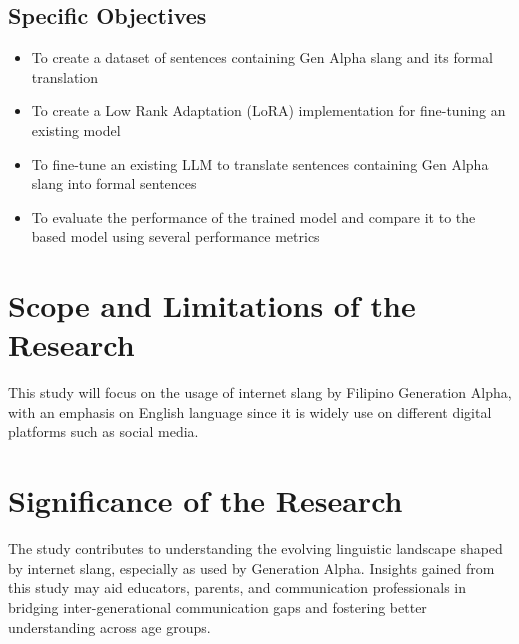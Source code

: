 \subsection{Specific Objectives}
\label{sec:specific_objectives}
\begin{itemize}
	\item To create a dataset of sentences containing Gen Alpha slang and its formal translation
	\item To create a Low Rank Adaptation (LoRA) implementation for fine-tuning an existing model
	\item To fine-tune an existing LLM to translate sentences containing Gen Alpha slang into formal sentences
	\item To evaluate the performance of the trained model and compare it to the based model using several performance metrics
\end{itemize}

\section{Scope and Limitations of the Research}
\label{sec:scope}
This study will focus on the usage of internet slang by Filipino Generation Alpha, with an emphasis on English language since it is widely use on different digital platforms such as social media.

\section{Significance of the Research}
\label{sec:significance}
The study contributes to understanding the evolving linguistic landscape shaped by internet slang, especially as used by Generation Alpha.
Insights gained from this study may aid educators, parents, and communication professionals in bridging inter-generational communication gaps and fostering better understanding across age groups.